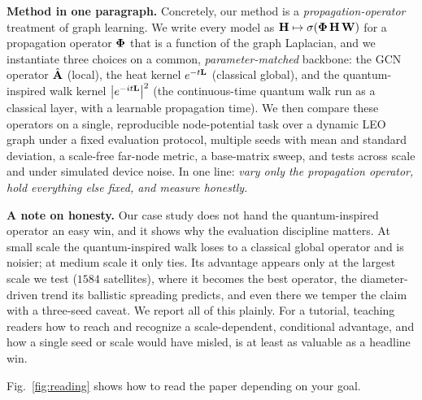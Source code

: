 \textbf{Method in one paragraph.} Concretely, our method is a \emph{propagation-operator}
treatment of graph learning. We write every model as $\mathbf{H}\mapsto\sigma(\boldsymbol{\Phi}\,\mathbf{H}\,\mathbf{W})$
for a propagation operator $\boldsymbol{\Phi}$ that is a function of the graph Laplacian, and we
instantiate three choices on a common, \emph{parameter-matched} backbone: the GCN operator
$\hat{\mathbf{A}}$ (local), the heat kernel $e^{-t\mathbf{L}}$ (classical global), and the
quantum-inspired walk kernel $\big|e^{-it\mathbf{L}}\big|^2$ (the continuous-time quantum walk
run as a classical layer, with a learnable propagation time). We then compare these
operators on a single, reproducible node-potential task over a dynamic LEO graph under a
fixed evaluation protocol, multiple seeds with mean and standard deviation, a scale-free
far-node metric, a base-matrix sweep, and tests across scale and under simulated device
noise. In one line: \emph{vary only the propagation operator, hold everything else fixed,
and measure honestly.}

\textbf{A note on honesty.} Our case study does not hand the quantum-inspired operator
an easy win, and it shows why the evaluation discipline matters. At small scale the
quantum-inspired walk loses to a classical global operator and is noisier; at medium
scale it only ties. Its advantage appears only at the largest scale we test ($1584$
satellites), where it becomes the best operator, the diameter-driven trend its ballistic
spreading predicts, and even there we temper the claim with a three-seed caveat. We
report all of this plainly. For a tutorial, teaching readers how to reach and recognize a
scale-dependent, conditional advantage, and how a single seed or scale would have
misled, is at least as valuable as a headline win.

Fig.~\ref{fig:reading} shows how to read the paper depending on your goal.


